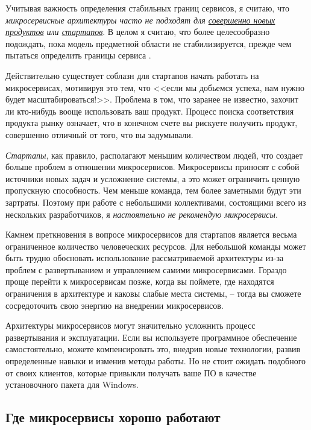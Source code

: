 \documentclass[%
	11pt,
	a4paper,
	utf8,
		]{article}
\begin{document}
Учитывая важность определения стабильных границ сервисов, я считаю, что \emph{\color{red}микросервисные архитектуры часто не подходят для \underline{совершенно новых продуктов} или \underline{стартапов}}. В целом я считаю, что более целесообразно подождать, пока модель предметной области не стабилизируется, прежде чем пытаться определить границы сервиса \cite[]{microservices-2024}.

Действительно существует соблазн для стартапов начать работать на микросервисах, мотивируя это тем, что <<если мы добьемся успеха, нам нужно будет масштабироваться!>>. Проблема в том, что заранее не известно, захочит ли кто-нибудь вооще использовать ваш продукт. Процесс поиска соответствия продукта рынку означает, что в конечном счете вы рискуете получить продукт, совершенно отличный от того, что вы задумывали.

\emph{Стартапы}, как правило, располагают меньшим количеством людей, что создает больше проблем в отношении микросервисов. Микросервисы приносят с собой источники новых задач и усложнение системы, а это может ограничить ценную пропускную способность. Чем меньше команда, тем более заметными будут эти зартраты. Поэтому при работе с небольшими коллективами, состоящими всего из нескольких разработчиков, я \emph{\color{red}настоятельно не рекомендую микросервисы}.

Камнем преткновения в вопросе микросервисов для стартапов является весьма ограниченное количество человеческих ресурсов. Для небольшой команды может быть трудно обосновать использование рассматриваемой архитектуры из-за проблем с развертыванием и управлением самими микросервисами. Гораздо проще перейти к микросервисам позже, когда вы поймете, где находятся ограничения в архитектуре и каковы слабые места системы, -- тогда вы сможете сосредоточить свою энергию на внедрении микросервисов.

Архитектуры микросервисов могут значительно усложнить процесс развертывания и эксплуатации. Если вы используете программное обеспечение самостоятельно, можете компенсировать это, внедрив новые технологии, развив определенные навыки и изменив методы работы. Но не стоит ожидать подобного от своих клиентов, которые привыкли получать ваше ПО в качестве установочного пакета для Windows.

\subsection{Где микросервисы хорошо работают}
\end{document}
